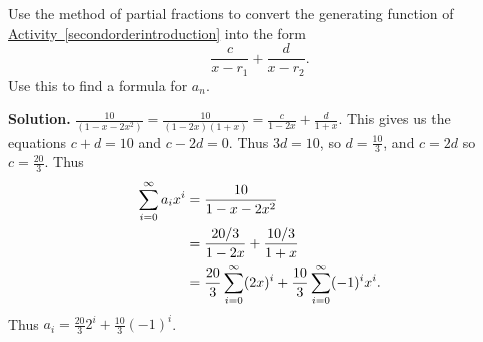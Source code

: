 \documentclass{book}
\begin{document}
\setcounter{project}{266}
\addtocounter{project}{-1}
\begin{activity}[]\label{activity-259}
\hypertarget{p-1404}{}%
Use the method of partial fractions to convert the generating function of \hyperref[secondorderintroduction]{Activity~\ref{secondorderintroduction}} into the form%
\begin{equation*}
\frac{c}{x-r_1} + \frac{d}{x-r_2}\text{.}
\end{equation*}
Use this to find a formula for \(a_n\).%
\par\smallskip%
\noindent\textbf{Solution.}\hypertarget{solution-188}{}\quad%
\hypertarget{p-1405}{}%
\(\frac{10}{(1-x-2x^2)}=\frac{10}{(1-2x)(1+x)} = \frac{c}{1-2x} +\frac{d}{1+x}\). This gives us the equations \(c+d=10\) and \(c-2d=0\). Thus \(3d=10\), so \(d=\frac{10}{3}\), and \(c=2d\) so \(c=\frac{20}{3}\). Thus%
\begin{align*}
\sum_{i=0}^\infty a_ix^i  &=  \frac{10}{1-x-2x^2}\\
&= \frac{20/3}{1-2x} + \frac{10/3}{1+x}\\
&= \frac{20}{3}\sum_{i=0}^\infty (2x)^i + \frac{10}{3}\sum_{i=0}^\infty (-1)^ix^i\text{.}
\end{align*}
Thus \(a_i=\frac{20}{3}2^i +\frac{10}{3}(-1)^i\).%
\end{activity}
\end{document}
